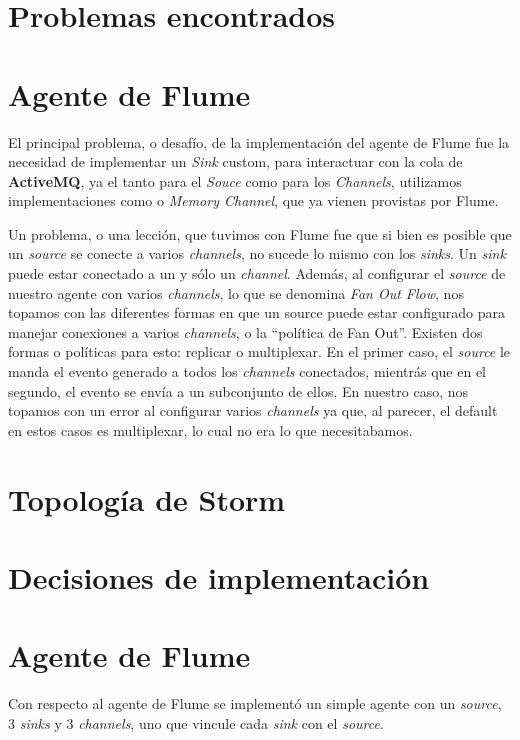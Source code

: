 \documentclass[a4paper,10pt]{article}
\begin{document}
\setcounter{page}{1}

\section{Problemas encontrados}

\section{Agente de Flume}
El principal problema, o desafío, de la implementación del agente de Flume fue la necesidad de implementar un \textit{Sink} custom, para interactuar con la cola
de \textbf{ActiveMQ}, ya el tanto para el \textit{Souce} como para los \textit{Channels}, utilizamos implementaciones como  o \textit{Memory Channel},
que ya vienen provistas por Flume.

Un problema, o una lección, que tuvimos con Flume fue que si bien es posible que un \textit{source} se conecte a varios \textit{channels}, no sucede lo mismo con los \textit{sinks}.
Un \textit{sink} puede estar conectado a un y sólo un \textit{channel}. Además, al configurar el \textit{source} de nuestro agente con varios \textit{channels}, lo que 
se denomina \textit{Fan Out Flow}, nos topamos con las
diferentes formas en que un source puede estar configurado para manejar conexiones a varios \textit{channels}, o la ``política de Fan Out''. Existen dos formas o políticas para esto:
replicar o multiplexar. En el primer caso, el \textit{source} le manda el evento generado a todos los \textit{channels} conectados, mientrás que en el segundo, el evento se envía
a un subconjunto de ellos. En nuestro caso, nos topamos con un error al configurar varios \textit{channels} ya que, al parecer, el default en estos casos es multiplexar, lo cual no 
era lo que necesitabamos.

\section{Topología de Storm}

\section{Decisiones de implementación}

\section{Agente de Flume}
Con respecto al agente de Flume se implementó un simple agente con un \textit{source}, 3 \textit{sinks} y 3 \textit{channels}, uno que vincule cada \textit{sink} con el 
\textit{source}. 
\end{document}
